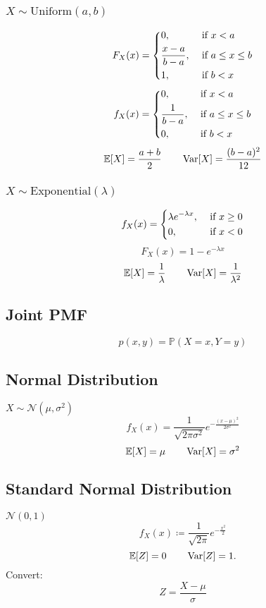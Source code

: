 \documentclass[10pt,landscape,a4paper]{article}
\begin{document}
\begin{multicols}{4}
\subsubsection*{\(X \sim \text{Uniform}(a, b)\)}
\[
    F_X(x) = \begin{dcases}
        0, &\text{ if } x < a \\
        \frac{x - a}{b - a}, &\text{ if } a \leq x \leq b \\
        1 , &\text{ if } b < x
    \end{dcases}
\]
\[
  f_X(x) = \begin{dcases}
    0, &\text{ if } x < a \\
    \frac{1}{b - a}, &\text{ if } a \leq x \leq b \\
    0 , &\text{ if } b < x
  \end{dcases}
\]
\[
  \mathbb{E}[X] = \dfrac{a + b}{2} \quad\quad \operatorname{Var}[X] = \dfrac{(b - a)^2}{12}
\]

\subsubsection*{\(X \sim \text{Exponential}(\lambda)\)}
\[
  f_X(x) = \begin{dcases}
    \lambda e^{-\lambda x} , &\text{ if }  x \geq 0\\
    0 , &\text{ if } x < 0
  \end{dcases}
\]
\[
    F_X(x) = 1 - e^{- \lambda x}
\]
\[
  \mathbb{E}[X] = \dfrac{1}{\lambda} \quad\quad \operatorname{Var}[X] = \dfrac{1}{\lambda^2}
\]

\subsection*{Joint PMF}
\[
    p(x, y) = \mathbb{P}(X = x, Y = y)
\]

\subsection*{Normal Distribution}
\(X \sim \mathcal{N}(\mu, \sigma^2)\) 
\[
  f_X(x) = \dfrac{1}{\sqrt{2\pi \sigma ^2}}e^{-\frac{(x - \mu)^2}{2\sigma^2}}
\]
\[
    \mathbb{E}[X] = \mu \quad\quad \operatorname{Var}[X] = \sigma^2
\]

\subsection*{Standard Normal Distribution}
\(\mathcal{N}(0, 1)\) 
\[
  f_X(x) \coloneqq \dfrac{1}{\sqrt{2\pi}} e^{-\frac{x^2}{2}}
\]
\[
  \mathbb{E}[Z] = 0 \quad\quad \operatorname{Var}[Z] = 1.
\]
Convert: 
\[
  Z = \frac{X - \mu}{\sigma}
\]


\end{multicols}
\end{document}
